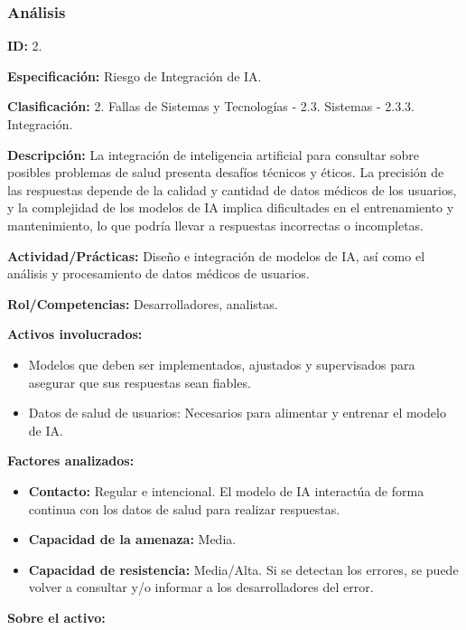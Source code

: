 \documentclass[a4paper,12pt]{article}
\begin{document}
    \subsubsection{Análisis}
    \par \textbf{ID:} 2.
    \par \textbf{Especificación:} Riesgo de Integración de IA.
    \par \textbf{Clasificación:} 2. Fallas de Sistemas y Tecnologías - 2.3. Sistemas - 2.3.3. Integración.
    \par \textbf{Descripción:} La integración de inteligencia artificial para consultar sobre posibles problemas de salud presenta desafíos técnicos y éticos. La precisión de las respuestas depende de la calidad y cantidad de datos médicos de los usuarios, y la complejidad de los modelos de IA implica dificultades en el entrenamiento y mantenimiento, lo que podría llevar a respuestas incorrectas o incompletas.
    \par \textbf{Actividad/Prácticas:} Diseño e integración de modelos de IA, así como el análisis y procesamiento de datos médicos de usuarios.
    \par \textbf{Rol/Competencias:} Desarrolladores, analistas.
    \par \textbf{Activos involucrados:}
    \begin{itemize}
        \item Modelos que deben ser implementados, ajustados y supervisados para asegurar que sus respuestas sean fiables.
        \item Datos de salud de usuarios: Necesarios para alimentar y entrenar el modelo de IA.
    \end{itemize}
    \par \textbf{Factores analizados:}
    \begin{itemize}
        \item \textbf{Contacto:} Regular e intencional. El modelo de IA interactúa de forma continua con los datos de salud para realizar respuestas.
        \item \textbf{Capacidad de la amenaza:} Media.
        \item \textbf{Capacidad de resistencia:} Media/Alta. Si se detectan los errores, se puede volver a consultar y/o informar a los desarrolladores del error.
    \end{itemize}
    \par \textbf{Sobre el activo:}
\end{document}
